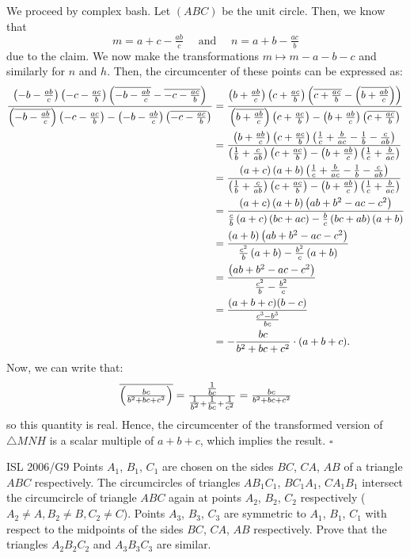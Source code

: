 \documentclass{article}
\begin{document}
We proceed by complex bash. Let $(ABC)$ be the unit circle. Then, we know that \[m = a+c-\tfrac{ab}{c} \quad \text{ and } \quad n = a+b-\tfrac{ac}{b}\] due to the claim. We now make the transformations $m \mapsto m-a-b-c$ and similarly for $n$ and $h$. Then, the circumcenter of these points can be expressed as:
{\allowdisplaybreaks
\begin{align*}
\dfrac{\left(-b-\tfrac{ab}{c}\right)\left(-c-\tfrac{ac}{b}\right)\left(\overline{-b-\tfrac{ab}{c}}-\overline{-c-\tfrac{ac}{b}}\right)}{\left(\overline{-b-\tfrac{ab}{c}}\right)\left(-c-\tfrac{ac}{b}\right)-\left(-b-\tfrac{ab}{c}\right)\left(\overline{-c-\tfrac{ac}{b}}\right)} &= \dfrac{\left(b+\tfrac{ab}{c}\right)\left(c+\tfrac{ac}{b}\right)\left(\overline{c+\tfrac{ac}{b}}-\left(\overline{b+\tfrac{ab}{c}}\right)\right)}{\left(\overline{b+\tfrac{ab}{c}}\right)\left(c+\tfrac{ac}{b}\right)-\left(b+\tfrac{ab}{c}\right)\left(\overline{c+\tfrac{ac}{b}}\right)} \\
&= \dfrac{\left(b+\tfrac{ab}{c}\right)\left(c+\tfrac{ac}{b}\right)\left(\tfrac{1}{c}+\tfrac{b}{ac}-\tfrac{1}{b}-\tfrac{c}{ab}\right)}{\left(\tfrac{1}{b}+\tfrac{c}{ab}\right)\left(c+\tfrac{ac}{b}\right)-\left(b+\tfrac{ab}{c}\right)\left(\tfrac{1}{c}+\tfrac{b}{ac}\right)} \\
&= \dfrac{\left(a+c\right)\left(a+b\right)\left(\tfrac{1}{c}+\tfrac{b}{ac}-\tfrac{1}{b}-\tfrac{c}{ab}\right)}{\left(\tfrac{1}{b}+\tfrac{c}{ab}\right)\left(c+\tfrac{ac}{b}\right)-\left(b+\tfrac{ab}{c}\right)\left(\tfrac{1}{c}+\tfrac{b}{ac}\right)} \\
&= \dfrac{\left(a+c\right)\left(a+b\right)\left(ab+b^2-ac-c^2\right)}{\tfrac{c}{b}\left(a+c\right)\left(bc+ac\right)-\tfrac{b}{c}\left(bc+ab\right)\left(a+b\right)} \\
&= \dfrac{\left(a+b\right)\left(ab+b^2-ac-c^2\right)}{\tfrac{c^2}{b}\left(a+b\right)-\tfrac{b^2}{c}\left(a+b\right)} \\
&= \dfrac{\left(ab+b^2-ac-c^2\right)}{\tfrac{c^2}{b}-\tfrac{b^2}{c}} \\
&= \dfrac{(a+b+c)(b-c)}{\tfrac{c^3-b^3}{bc}} \\
&= -\dfrac{bc}{b^2+bc+c^2}\cdot(a+b+c).
\end{align*}
}
Now, we can write that: \[\overline{\left(\tfrac{bc}{b^2+bc+c^2}\right)} = \tfrac{\tfrac{1}{bc}}{\tfrac{1}{b^2}+\tfrac{1}{bc}+\tfrac{1}{c^2}} = \tfrac{bc}{b^2+bc+c^2}\] so this quantity is real. Hence, the circumcenter of the transformed version of $\triangle MNH$ is a scalar multiple of $a+b+c$, which implies the result. $\square$

\begin{problem}[6.43]{ISL 2006/G9}
Points $ A_{1}$, $ B_{1}$, $ C_{1}$ are chosen on the sides $ BC$, $ CA$, $ AB$ of a triangle $ ABC$ respectively. The circumcircles of triangles $ AB_{1}C_{1}$, $ BC_{1}A_{1}$, $ CA_{1}B_{1}$ intersect the circumcircle of triangle $ ABC$ again at points $ A_{2}$, $ B_{2}$, $ C_{2}$ respectively  ($ A_{2}\neq A, B_{2}\neq B, C_{2}\neq C$).  Points $ A_{3}$, $ B_{3}$, $ C_{3}$ are symmetric to $ A_{1}$, $ B_{1}$, $ C_{1}$ with respect to the midpoints of the sides $ BC$, $ CA$, $ AB$ respectively. Prove that the triangles $ A_{2}B_{2}C_{2}$ and $ A_{3}B_{3}C_{3}$ are similar.
\end{problem}
\end{document}

